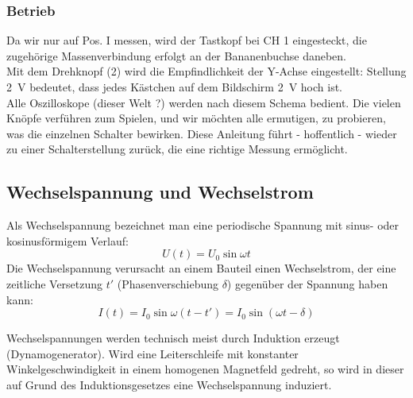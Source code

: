 \subsubsection{Betrieb}

Da wir nur auf Pos. I messen, wird der Tastkopf bei CH 1 eingesteckt, die zugehörige Massenverbindung erfolgt an der Bananenbuchse daneben.\\
Mit dem Drehknopf (2) wird die Empfindlichkeit der Y-Achse eingestellt: Stellung 2~V bedeutet, dass jedes Kästchen auf dem Bildschirm 2~V hoch ist.\\

\noindent
Alle Oszilloskope (dieser Welt ?) werden nach diesem Schema bedient. Die vielen Knöpfe verführen zum Spielen, und wir möchten alle ermutigen, zu probieren, was die einzelnen Schalter bewirken. Diese Anleitung führt - hoffentlich - wieder zu einer Schalterstellung zurück, die eine richtige Messung ermöglicht.

\subsection{Wechselspannung und Wechselstrom}

Als Wechselspannung bezeichnet man eine periodische Spannung mit sinus- oder kosinusförmigem Verlauf:
\begin{equation}
 U(t) = U_0 \sin\omega t
\end{equation}
%
Die Wechselspannung verursacht an einem Bauteil einen Wechselstrom, der eine zeitliche Versetzung $t'$ (Phasenverschiebung $\delta$) gegenüber der Spannung haben kann:
\begin{equation}
 I(t) = I_0 \sin\omega(t-t') = I_0 \sin(\omega t - \delta)
\end{equation}

\noindent
Wechselspannungen werden technisch meist durch Induktion erzeugt (Dynamogenerator). Wird eine Leiterschleife mit konstanter Winkelgeschwindigkeit in einem homogenen Magnetfeld gedreht, so wird in dieser auf Grund des Induktionsgesetzes eine Wechselspannung induziert.\\

